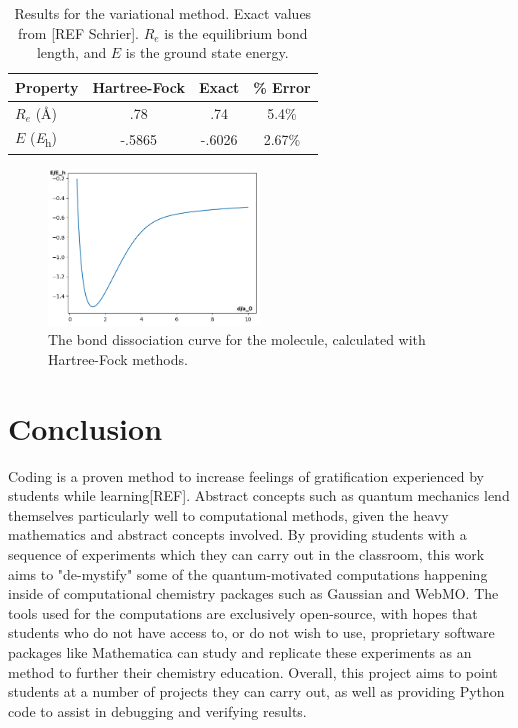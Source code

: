 \documentclass[journal=jacsat,manuscript=communication]{achemso}
\begin{document}
{{\setlength{\extrarowheight}{2pt}
\begin{table}[H]
  \begin{tabular}{l|ccc}
    Property & Hartree-Fock & Exact & \% Error \\
    \hline
    $R_e$ (\si{\angstrom}) & .78 & .74 & 5.4\%\\
    $E$ (\si{\hartree}) & -.5865 & -.6026 & 2.67\%
  \end{tabular}
  \caption{Results for the variational method.  Exact values from [REF Schrier].  $R_e$ is the equilibrium bond length, and $E$ is the ground state energy. }
  \label{tab:hf}
\end{table}

\begin{figure}[H]
  \includegraphics[width=0.5\textwidth]{figures/Bond_Dissociation_Hydrogen.png}
  \caption{The bond dissociation curve for the  molecule, calculated with Hartree-Fock methods.}
\end{figure}

\section{Conclusion}
Coding is a proven method to increase feelings of gratification experienced by students while learning[REF].  Abstract concepts such as quantum mechanics lend themselves particularly well to computational methods, given the heavy mathematics and abstract concepts involved.  By providing students with a sequence of experiments which they can carry out in the classroom, this work aims to "de-mystify" some of the quantum-motivated computations happening inside of computational chemistry packages such as Gaussian and WebMO. The tools used for the computations are exclusively open-source, with hopes that students who do not have access to, or do not wish to use, proprietary software packages like Mathematica can study and replicate these experiments as an method to further their chemistry education. Overall, this project aims to point students at a number of projects they can carry out, as well as providing Python code to assist in debugging and verifying results. 

}}
\end{document}
